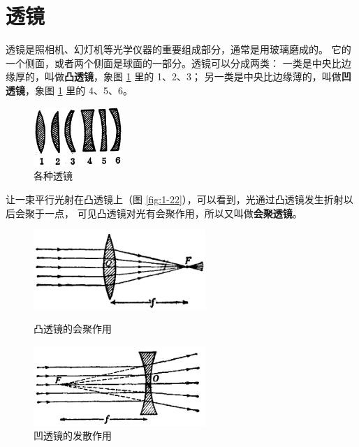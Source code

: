 \section{透镜}\label{sec:1-6}

透镜是照相机、幻灯机等光学仪器的重要组成部分，通常是用玻璃磨成的。
它的一个侧面，或者两个侧面是球面的一部分。透镜可以分成两类：
一类是中央比边缘厚的，叫做\textbf{凸透镜}，象图 \ref{fig:1-21} 里的 1、2、3；
另一类是中央比边缘薄的，叫做\textbf{凹透镜}，象图 \ref{fig:1-21} 里的 4、5、6。

\begin{figure}[htbp]
    \centering
    \includegraphics[width=0.3\textwidth]{../pic/czwl2-ch1-21}
    \caption{各种透镜}\label{fig:1-21}
\end{figure}

让一束平行光射在凸透镜上（图 \ref{fig:1-22}），可以看到，光通过凸透镜发生折射以后会聚于一点，
可见凸透镜对光有会聚作用，所以又叫做\textbf{会聚透镜}。

\begin{figure}[htbp]
    \centering
    \begin{minipage}{7cm}
    \centering
    \includegraphics[width=6.5cm]{../pic/czwl2-ch1-22}
    \caption{凸透镜的会聚作用}\label{fig:1-22}
    \end{minipage}
    \qquad
    \begin{minipage}{7cm}
    \centering
    \includegraphics[width=6.5cm]{../pic/czwl2-ch1-23}
    \caption{凹透镜的发散作用}\label{fig:1-23}
    \end{minipage}
\end{figure}

